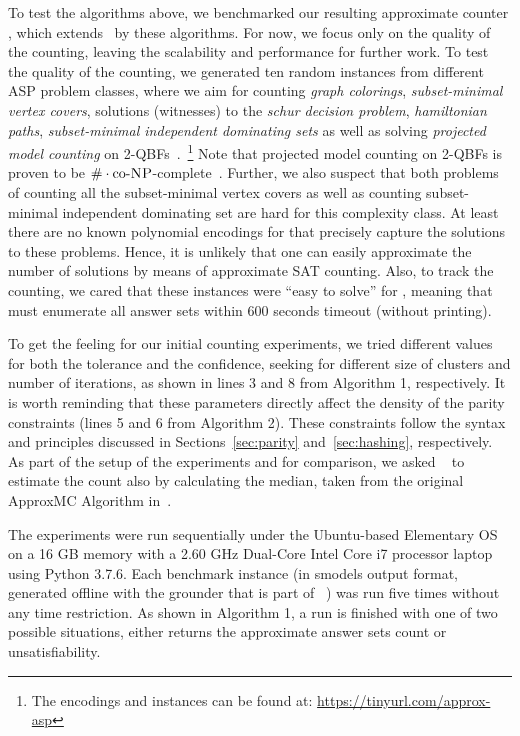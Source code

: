 To test the algorithms above, we benchmarked our resulting approximate counter \xampler, which extends \xorro\, by these algorithms.
For now, we focus only on the quality of the counting, leaving the scalability and performance for further work.
%
To test the quality of the counting,
we generated ten random instances from different ASP problem classes, where we aim for counting \emph{graph colorings}, \emph{subset-minimal vertex covers}, solutions (witnesses) to the \emph{schur decision problem}, \emph{hamiltonian paths}, \emph{subset-minimal independent dominating sets} as well as solving \emph{projected model counting} on 2-QBFs~\cite{DurandHermannKolaitis05,KleineBuningLettman99}.~\footnote{The encodings and instances can be found at: \url{https://tinyurl.com/approx-asp}}
Note that projected model counting on 2-QBFs is proven to be $\#\cdot\text{co-}\textsc{NP}$-complete~\cite{DurandHermannKolaitis05}. Further, we also suspect that both problems of counting all the subset-minimal vertex covers as well as counting subset-minimal independent dominating set are hard for this complexity class. At least there are no known polynomial encodings for \SAT that precisely capture the solutions to these problems. Hence, it is unlikely that one can easily approximate the number of solutions by means of approximate SAT counting.
Also, to track the counting, we cared that these instances were ``easy to solve'' for \clingo{},
meaning that \clingo{} must enumerate all answer sets within 600 seconds timeout (without printing).

To get the feeling for our initial counting experiments, we tried different values for both the tolerance and the confidence, seeking for different size of clusters and number of iterations,
as shown in lines 3 and 8 from Algorithm 1, respectively.
It is worth reminding that these parameters directly affect the density of the parity constraints (lines 5 and 6 from Algorithm 2). These constraints follow the syntax and principles discussed in Sections~\ref{sec:parity} and~\ref{sec:hashing}, respectively.
As part of the setup of the experiments and for comparison, we asked \xorro{}~\cite{DBLP:conf/lpnmr/EverardoJKS19} to estimate the count also by calculating the median, taken from the original ApproxMC Algorithm in~\cite{ChakrabortyMV13}.

The experiments were run sequentially under the Ubuntu-based Elementary OS on a 16 GB memory with a 2.60 GHz Dual-Core Intel Core i7 processor laptop using Python 3.7.6.
Each benchmark instance (in smodels output format, generated offline with the grounder \gringo{} that is part of \clingo{}~\cite{DBLP:conf/iclp/GebserKKOSW16}) was run five times without any time restriction. 
As shown in Algorithm 1, a run is finished with one of two possible situations, either \xorro{} returns the approximate answer sets count or unsatisfiability.

